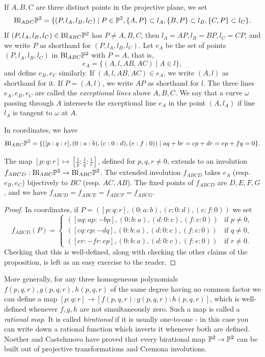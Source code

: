 \begin{defn} If $A,B,C$ are three distinct points in the projective plane, we set
\[
\text{\rm Bl}_{ABC}\mathbb{P}^2 = \{(P,l_A,l_B,l_C)\mid P \in \mathbb{P}^2, \{A,P\} \subset l_A, \{B,P\} \subset l_B, \{C,P\} \subset l_C\}.
\]
If $(P,l_A,l_B,l_C) \in \text{\rm Bl}_{ABC}\mathbb{P}^2$ has $P \ne A,B,C$, then $l_A = AP, l_B = BP, l_C = CP$, and we write $P$ as shorthand for $(P,l_A,l_B,l_C)$. Let $e_A$ be the set of points $(P,l_A,l_B,l_C)$ in $\text{\rm Bl}_{ABC}\mathbb{P}^2$ with $P = A$, that is,
\[
e_A = \{(A,l,AB,AC) \mid A\in l\},
\]
and define $e_B, e_C$ similarly. If $(A,l,AB,AC)\in e_A$, we write $(A,l)$ as shorthand for it. If $P = (A,l)$, we write $AP$ as shorthand for $l$. The three lines $e_A, e_B, e_C$ are called the \emph{exceptional lines} above $A,B,C$. We say that a curve $\omega$ passing through $A$ intersects the exceptional line $e_A$ in the point $(A,l_A)$ if line $l_A$ is tangent to $\omega$ at $A$.
\end{defn}

In coordinates, we have
\[
\text{\rm Bl}_{ABC}\mathbb{P}^2 = \{([p:q:r],(0:a:b),(c:0:d),(e:f:0))\mid aq+br = cp+dr = ep+fq = 0\}.
\]

\begin{prop} The map $[p:q:r]\mapsto [\frac{1}{p}:\frac{1}{q}:\frac{1}{r}]$, defined for $p,q,r \ne 0$, extends to an involution $f_{ABCD} : \text{\rm Bl}_{ABC}\mathbb{P}^2 \rightarrow \text{\rm Bl}_{ABC}\mathbb{P}^2$. The extended involution $f_{ABCD}$ takes $e_A$ (resp. $e_B, e_C$) bijectively to $BC$ (resp. $AC, AB$). The fixed points of $f_{ABCD}$ are $D,E,F,G$, and we have $f_{ABCD} = f_{ABCE} = f_{ABCF} = f_{ABCG}$.
\end{prop}
\begin{proof} In coordinates, if $P = ([p:q:r],(0:a:b),(c:0:d),(e:f:0))$ we set
\[
f_{ABCD}(P) = \begin{cases}([aq:ap:-bp],(0:b:a),(d:0:c),(f:e:0)) & \mbox{if }p\ne 0,\\([cq:cp:-dq],(0:b:a),(d:0:c),(f:e:0)) & \mbox{if }q\ne 0,\\ ([er:-fr:ep],(0:b:a),(d:0:c),(f:e:0)) & \mbox{if }r\ne 0.\end{cases}
\]
Checking that this is well-defined, along with checking the other claims of the proposition, is left as an easy exercise to the reader.
\end{proof}

\begin{rem} More generally, for any three homogeneous polynomials $f(p,q,r),g(p,q,r),h(p,q,r)$ of the same degree having no common factor we can define a map $[p:q:r] \rightarrow [f(p,q,r):g(p,q,r):h(p,q,r)]$, which is well-defined whenever $f,g,h$ are not simultaneously zero. Such a map is called a \emph{rational map}. It is called \emph{birational} if it is usually one-to-one - in this case you can write down a rational function which inverts it whenever both are defined. Noether and Castelnuovo have proved that every birational map $\mathbb{P}^2\rightarrow \mathbb{P}^2$ can be built out of projective transformations and Cremona involutions.
\end{rem}

